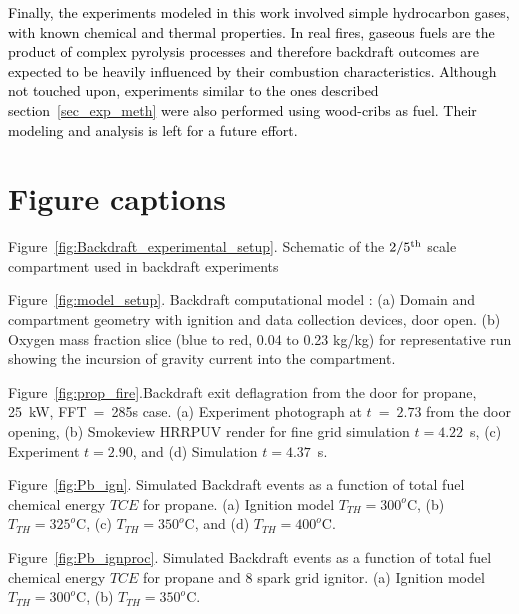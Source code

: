 \documentclass[12pt,letterpaper]{article}
\begin{document}
\begin{flushleft}
\textcolor{black}{Finally, the experiments modeled in this work involved simple hydrocarbon gases, with known chemical and thermal properties. In real fires, gaseous fuels are the product of complex pyrolysis processes and therefore backdraft outcomes are expected to be heavily influenced by their combustion characteristics. Although not touched upon, experiments similar to the ones described section~\ref{sec_exp_meth} were also performed using wood-cribs as fuel. Their modeling and analysis is left for a future effort.} 



	
\newpage %
\section*{Figure captions}
Figure~\ref{fig:Backdraft_experimental_setup}. Schematic of the $2/5^{\rm{th}}$ scale compartment used in backdraft experiments

Figure~\ref{fig:model_setup}. Backdraft computational model : (a) Domain and compartment geometry with ignition and data collection devices, door open. (b) Oxygen mass fraction slice (blue to red, 0.04 to 0.23 kg/kg) for representative run showing the incursion of gravity current into the compartment.

Figure~\ref{fig:prop_fire}.Backdraft exit deflagration from the door for propane, 25~kW, FFT~=~285s case. (a) Experiment photograph at $t~=~2.73$ from the door opening, (b) Smokeview HRRPUV render for fine grid simulation $t=4.22$~s, (c) Experiment $t=2.90$, and (d) Simulation $t=4.37$~s.

Figure~\ref{fig:Pb_ign}. Simulated Backdraft events as a function of total fuel chemical energy $TCE$ for propane. (a) Ignition model $T_{TH}=300^o$C, (b) $T_{TH}=325^o$C, (c) $T_{TH}=350^o$C, and (d) $T_{TH}=400^o$C.

Figure~\ref{fig:Pb_ignproc}. Simulated Backdraft events as a function of total fuel chemical energy $TCE$ for propane and 8 spark grid ignitor. (a) Ignition model $T_{TH}=300^o$C, (b) $T_{TH}=350^o$C.



\end{flushleft}
\end{document}
